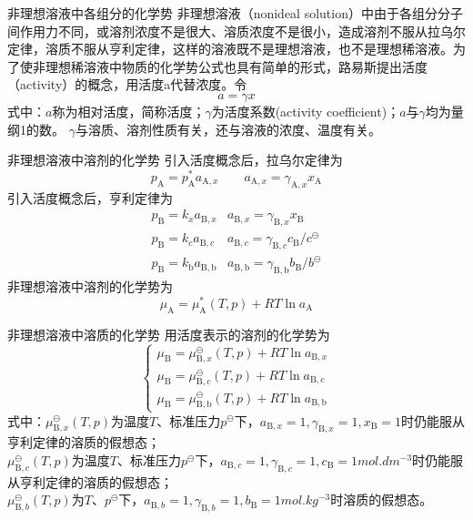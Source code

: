 \begin{frame}{非理想溶液中各组分的化学势}
    非理想溶液（nonideal solution）中由于各组分分子间作用力不同，或溶剂浓度不是很大、溶质浓度不是很小，造成溶剂不服从拉乌尔定律，溶质不服从亨利定律，这样的溶液既不是理想溶液，也不是理想稀溶液。为了使非理想稀溶液中物质的化学势公式也具有简单的形式，路易斯提出活度（activity）的概念，用活度a代替浓度。令
    $$a=\gamma x$$
    式中：$a$称为相对活度，简称活度；$\gamma$为活度系数(activity coefficient)；$a$与$\gamma$均为量纲1的数。
    $\gamma$与溶质、溶剂性质有关，还与溶液的浓度、温度有关。
\end{frame}


\begin{frame}{非理想溶液中溶剂的化学势}
    引入活度概念后，拉乌尔定律为
    $$p_{\mathrm{A}}=p_{\mathrm{A}}^{*} a_{\mathrm{A}, x} \qquad a_{\mathrm{A}, x}=\gamma_{\mathrm{A}, x} x_{\mathrm{A}}$$
    引入活度概念后，亨利定律为\\
    $$\begin{aligned}
        p_{\mathrm{B}}=k_{x} a_{\mathrm{B}, x} & a_{\mathrm{B}, x}=\gamma_{\mathrm{B}, x} x_{\mathrm{B}} \\
        p_{\mathrm{B}}=k_{c} a_{\mathrm{B}, c} & a_{\mathrm{B}, c}=\gamma_{\mathrm{B}, c} c_{\mathrm{B}} / c^{\ominus} \\
        p_{\mathrm{B}}=k_{\mathrm{b}} a_{\mathrm{B}, \mathrm{b}} & a_{\mathrm{B}, \mathrm{b}}=\gamma_{\mathrm{B}, \mathrm{b}} b_{\mathrm{B}} / b^{\ominus}
        \end{aligned}$$
    非理想溶液中溶剂的化学势为
    $$\mu_{\mathrm{A}}=\mu_{\mathrm{A}}^{*}(T, p)+R T \ln a_{\mathrm{A}}$$
\end{frame}


\begin{frame}{非理想溶液中溶质的化学势}
    用活度表示的溶剂的化学势为
    $$\left\{\begin{array}{l}
        \mu_{\mathrm{B}}=\mu_{\mathrm{B}, x}^{\ominus}(T, p)+R T \ln a_{\mathrm{B}, x} \\
        \mu_{\mathrm{B}}=\mu_{\mathrm{B}, c}^{\ominus}(T, p)+R T \ln a_{\mathrm{B}, c} \\
        \mu_{\mathrm{B}}=\mu_{\mathrm{B}, \mathrm{b}}^{\ominus}(T, p)+R T \ln a_{\mathrm{B}, \mathrm{b}}
        \end{array}\right.$$
    式中：$\mu_{\mathrm{B}, x}^{\ominus}(T, p)$为温度$T$、标准压力$p^\ominus$下，$a_{\mathrm{B}, x}=1, \gamma_{\mathrm{B}, x}=1, x_{\mathrm{B}}=1$时仍能服从亨利定律的溶质的假想态；
    \\$\mu_{\mathrm{B}, c}^{\ominus}(T, p)$为温度$T$、标准压力$p^\ominus$下，$a_{\mathrm{B}, c}=1, \gamma_{\mathrm{B}, c}=1, c_{\mathrm{B}}=1 \si{mol.dm^{-3}}$时仍能服从亨利定律的溶质的假想态；
    \\$\mu_{\mathrm{B}, b}^{\ominus}(T, p)$为$T$、$p^\ominus$下，$a_{\mathrm{B}, b}=1, \gamma_{\mathrm{B}, b}=1, b_{\mathrm{B}}=1 \si{mol.kg^{-3}}$时溶质的假想态。
\end{frame}